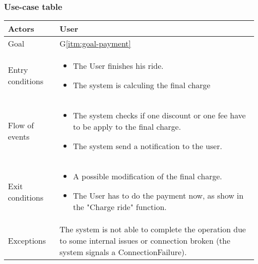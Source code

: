 

\subsubsection{Use-case table}
\begin{center}
  \begin{tabular}{ l | p{10cm} }
    \hline
    Actors & User\\ \hline
    Goal & G\ref{itm:goal-payment}\\ \hline %
    Entry conditions & \begin{itemize}
			\item The User finishes his ride.
			\item The system is calculing the final charge

\end{itemize}  \\ \hline
    Flow of events &
\begin{itemize}
\item The system checks if one discount or one fee have to be apply to the final charge.
\item The system send a notification to the user.
\end{itemize} \\ \hline
    Exit conditions &
\begin{itemize}
	\item A possible modification of the final charge.
  \item The User has to do the payment now, as show in the "Charge ride" function.
\end{itemize}  \\ \hline
  Exceptions & 

The system is not able to complete the operation due to some internal issues or connection broken (the system signals a ConnectionFailure).%
\\ \hline
  \end{tabular}
\end{center}


